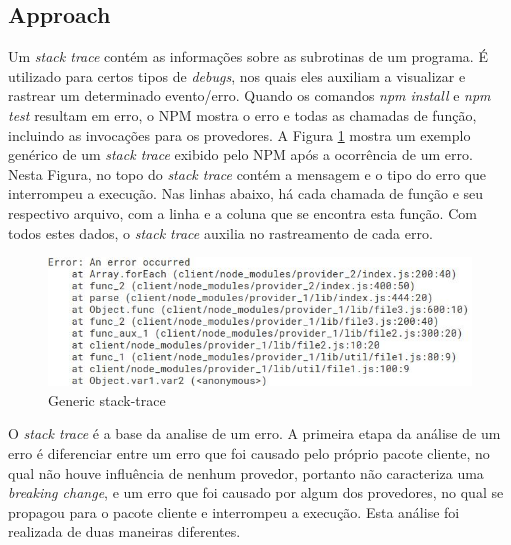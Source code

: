 \subsection{Approach}
\label{apr:rq1}
Um \textit{stack trace} contém as informações sobre as subrotinas de um programa. É utilizado para certos tipos de \textit{debugs}, nos quais eles auxiliam a visualizar e rastrear um determinado evento/erro. Quando os comandos \textit{npm install} e \textit{npm test} resultam em erro, o \Gls{NPM} mostra o erro e todas as chamadas de função, incluindo as invocações para os provedores. A Figura \ref{fig:trace} mostra um exemplo genérico de um \textit{stack trace} exibido pelo \Gls{NPM} após a ocorrência de um erro. Nesta Figura, no topo do \textit{stack trace} contém a mensagem e o tipo do erro que interrompeu a execução. Nas linhas abaixo, há cada chamada de função e seu respectivo arquivo, com a linha e a coluna que se encontra esta função. Com todos estes dados, o \textit{stack trace} auxilia no rastreamento de cada erro.

\begin{figure}
    \centering
    \includegraphics[scale=0.7]{figuras/stack_trace.jpeg}
    \caption{Generic stack-trace}
    \label{fig:trace}
\end{figure}{}

O \textit{stack trace} é a base da analise de um erro. A primeira etapa da análise de um erro é diferenciar entre um erro que foi causado pelo próprio pacote cliente, no qual não houve influência de nenhum provedor, portanto não caracteriza uma \textit{breaking change}, e um erro que foi causado por algum dos provedores, no qual se propagou para o pacote cliente e interrompeu a execução. Esta análise foi realizada de duas maneiras diferentes.

